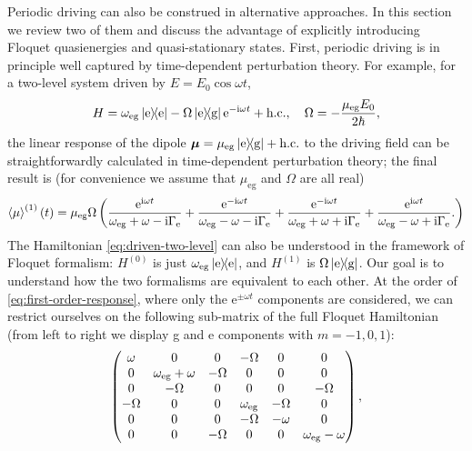 \documentclass[hyperref, a4paper]{article}
\newcommand*{\ii}{\mathrm{i}}
\newcommand*{\ee}{\mathrm{e}}
\newcommand*{\Gammae}{\Gamma_{\text{e}}}
\newcommand*{\omegaeg}{\omega_{\text{eg}}}
\newcommand*{\mueg}{\mu_{\text{eg}}}
\begin{document}
Periodic driving can also be construed in alternative approaches.
In this section we review two of them and discuss the advantage 
of explicitly introducing Floquet quasienergies and quasi-stationary states.
First, periodic driving is in principle well captured by time-dependent perturbation theory.
For example, for a two-level system driven by $E = E_0 \cos \omega t$,
\begin{equation}
    H = \omegaeg \dyad{\text{e}} - \Omega \dyad*{\text{e}}{\text{g}} \ee^{- \ii \omega t} + \text{h.c.}, 
    \quad \Omega = - \frac{\mueg E_0}{2 \hbar}, 
    \label{eq:driven-two-level}
\end{equation}
the linear response of the dipole 
$\vb*{\mu} = \mueg \dyad*{\text{e}}{\text{g}} + \text{h.c.}$
to the driving field can be straightforwardly calculated 
in time-dependent perturbation theory; the final result is 
(for convenience we assume that $\mueg$ and $\Omega$ are all real)
\begin{equation}
    \expval{\mu}^{(1)}(t) = \mueg \Omega \left(
        \frac{\ee^{\ii \omega t}}{\omegaeg + \omega - \ii \Gammae}
        + \frac{\ee^{- \ii \omega t}}{\omegaeg - \omega - \ii \Gammae}
        + \frac{\ee^{- \ii \omega t}}{\omegaeg + \omega + \ii \Gammae}
        + \frac{\ee^{\ii \omega t}}{\omegaeg - \omega + \ii \Gammae}.
    \right)
    \label{eq:first-order-response}
\end{equation}
The Hamiltonian \eqref{eq:driven-two-level} can also be understood in the framework of Floquet formalism:
$H^{(0)}$ is just $\omegaeg \dyad{\text{e}}$,
and $H^{(1)}$ is $\Omega \dyad*{\text{e}}{\text{g}}$.
Our goal is to understand how the two formalisms are equivalent to each other.
At the order of \eqref{eq:first-order-response}, 
where only the $\ee^{\pm \omega t}$ components are considered,
we can restrict ourselves on the following sub-matrix of the full Floquet Hamiltonian
(from left to right we display g and e components with $m = -1, 0, 1$):
\begin{equation}
    \pmqty{
        \omega  & 0                  & 0        &-\Omega   & 0        & 0                \\
        0       & \omegaeg + \omega  &-\Omega   & 0        & 0        & 0                \\
        0       &-\Omega             & 0        & 0        & 0        &-\Omega           \\
       -\Omega  & 0                  & 0        & \omegaeg &-\Omega   & 0                \\
        0       & 0                  & 0        &-\Omega   & - \omega & 0                \\
        0       & 0                  &-\Omega   & 0        & 0        & \omegaeg - \omega\\
    },
\end{equation}
\end{document}
